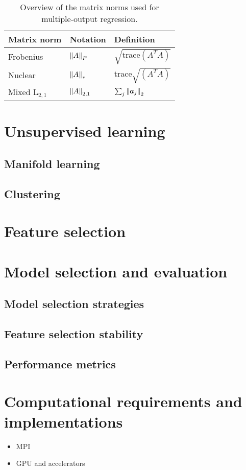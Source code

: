 	\begin{table}[htb]
		\centering
		\caption{Overview of the matrix norms used for multiple-output regression.}\label{tab:norms}
		\begin{tabular}{l|l|l}
			\toprule
			Matrix norm  & Notation         & Definition                      \\  \midrule
			Frobenius        & $\left\lVert A\right\rVert_F$     & $\sqrt{\text{trace}(A^TA)}$     \\ [0.05cm]
			Nuclear          & $\left\lVert A\right\rVert_*$     & $\text{trace}\sqrt{(A^TA)}$     \\ [0.05cm]
			Mixed $\text{L}_{2,1}$        & $\left\lVert A\right\rVert_{2,1}$ & $\sum_{j}\left\lVert\bm{a}_j\right\rVert_2$ \\ \bottomrule
		\end{tabular}
	\end{table}




  \section{Unsupervised learning} \label{subsec:unsupervised_learning}
    \subsection{Manifold learning}
    \subsection{Clustering}

  \section{Feature selection} \label{subsec:feature_selection}

  \section{Model selection and evaluation} \label{subsec:model_selection}
    \subsection{Model selection strategies}
    \subsection{Feature selection stability}
    \subsection{Performance metrics}


\section{Computational requirements and implementations} \label{sec:implementation}
\begin{itemize}
  \item MPI
  \item GPU and accelerators
\end{itemize}
